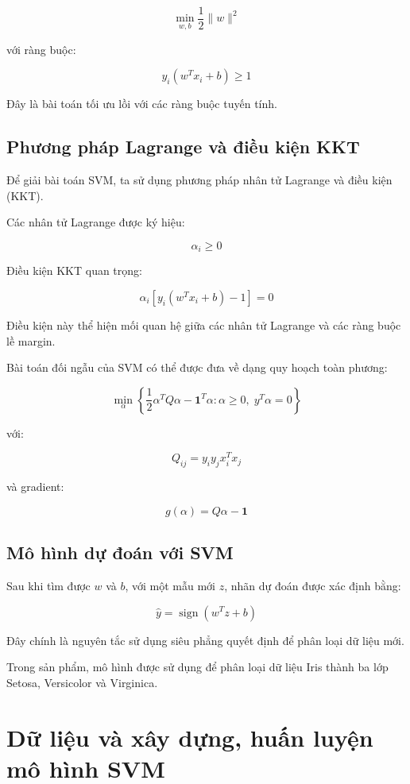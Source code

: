 \documentclass[12pt,a4paper]{report}
\begin{document}
$$
\min_{w,b}
\frac{1}{2}\|w\|^2
$$

với ràng buộc:

$$
y_i(w^Tx_i+b)\geq1
$$

\noindent
Đây là bài toán tối ưu lồi với các ràng buộc tuyến tính.

\section{Phương pháp Lagrange và điều kiện KKT}

Để giải bài toán SVM, ta sử dụng phương pháp
{nhân tử Lagrange} và điều kiện
 (KKT).

\noindent
Các nhân tử Lagrange được ký hiệu:

$$
\alpha_i\geq0
$$

\noindent
Điều kiện KKT quan trọng:

$$
\alpha_i
\left[
y_i(w^Tx_i+b)-1
\right]=0
$$

Điều kiện này thể hiện mối quan hệ giữa các nhân tử Lagrange và các ràng buộc lề margin.

\noindent
Bài toán đối ngẫu của SVM có thể được đưa về dạng quy hoạch toàn phương:

$$
\min_\alpha
\left\{
\frac{1}{2}\alpha^TQ\alpha-\mathbf{1}^T\alpha
:
\alpha\geq0,\;
y^T\alpha=0
\right\}
$$

với:

$$
Q_{ij}=y_iy_jx_i^Tx_j
$$

và gradient:

$$
g(\alpha)=Q\alpha-\mathbf{1}
$$

\section{Mô hình dự đoán với SVM}

Sau khi tìm được $w$ và $b$, với một mẫu mới $z$, nhãn dự đoán được xác định
bằng:

$$
\hat{y}=\operatorname{sign}(w^Tz+b)
$$

Đây chính là nguyên tắc sử dụng siêu phẳng quyết định để phân loại dữ liệu mới.

Trong sản phẩm, mô hình được sử dụng để phân loại dữ liệu Iris thành ba lớp Setosa, Versicolor và Virginica.




		\chapter{Dữ liệu và xây dựng, huấn luyện mô hình SVM}
		
\end{document}
